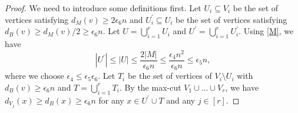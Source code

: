 \documentclass[10pt]{article}
\begin{document}
\begin{proof}
We need to introduce some definitions first.
Let $U_i\subseteq V_i$ be the set of vertices satisfying $d_M(v)\geq 2\epsilon_6 n$ and $U^\prime_i\subseteq U_i$ be the set of vertices satisfying $d_B(v)\geq d_M(v)/2\geq \epsilon_6 n$.
Let $U=\bigcup^{r}_{i=1}U_i$ and $U^\prime=\bigcup^{r}_{i=1}U^\prime_i$.
Using \eqref{M}, we have
\begin{equation}\label{s prime is small}
|U^\prime|\leq|U|\leq \frac{2|M|}{\epsilon_6 n}\leq \frac{\epsilon_4 n^2}{\epsilon_6 n}\leq  \epsilon_5n,
\end{equation}
where we choose $\epsilon_4\leq \epsilon_5\epsilon_6 $.
Let $T_i$ be the set of vertices of $V_i\setminus U_i$ with $d_B(v)\geq \epsilon_6n$ and $T=\bigcup_{i=1}^rT_i$.
By the max-cut $V_1\cup\ldots\cup V_r$, we have $d_{V_{j}}(x)\geq d_B(x)\geq \epsilon_6n$ for any $x\in U^\prime\cup T$ and any $j\in [r]$.



\end{proof}
\end{document}
